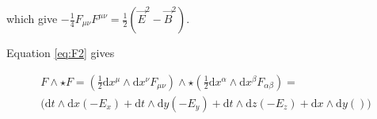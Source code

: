  which give $-\frac{1}{4}F_{\mu \nu} F^{\mu \nu}=\frac{1}{2} (\vec{E}^2-\vec{B}^2)$. 
 
 Equation \ref{eq:F2} gives 
 
 \begin{gather*}
  F\wedge \star F=(\frac{1}{2}\mathrm{d }x^{\mu} \wedge \mathrm{d }x^{\nu} F_{\mu\nu})\wedge \star (\frac{1}{2}\mathrm{d}x^{\alpha} \wedge \mathrm{d}x^{\beta} F_{\alpha\beta})= \\
\big(\mathrm{d}t \wedge \mathrm{d}x(-E_x)+\mathrm{d}t \wedge \mathrm{d}y(-E_y)+ \mathrm{d}t \wedge \mathrm{d}z(-E_z)+\mathrm{d}x \wedge \mathrm{d}y () \big)
\end{gather*}
